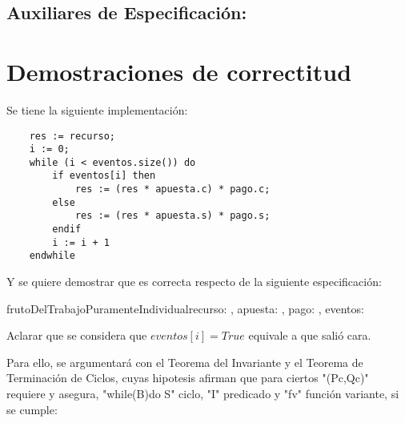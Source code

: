 \documentclass[10pt,a4paper]{article}
\begin{document}
\subsection{Auxiliares de Especificación:}

	{
	}

	{
	}
	{
	}

\section{Demostraciones de correctitud}

 Se tiene la siguiente implementación:

\begin{lstlisting}
	res := recurso;
	i := 0;
	while (i < eventos.size()) do
		if eventos[i] then
			res := (res * apuesta.c) * pago.c;
		else
			res := (res * apuesta.s) * pago.s;
		endif
		i := i + 1
	endwhile
\end{lstlisting}

 Y se quiere demostrar que es correcta respecto de la siguiente especificación:
\begin{proc}{frutoDelTrabajoPuramenteIndividual}{\In recurso: \float, \In apuesta: , \In pago: , \In eventos: \TLista{\bool} }{\float}



\end{proc}

 Aclarar que se considera que $eventos[i] = True$ equivale a que salió cara.

 \vspace{0.3cm}

 Para ello, se argumentará con el Teorema del Invariante y el Teorema de Terminación de Ciclos, cuyas hipotesis afirman que
 para ciertos "(Pc,Qc)" requiere y asegura, "while(B)do S" ciclo, "I" predicado y "fv" función variante, si se cumple:
\end{document}
